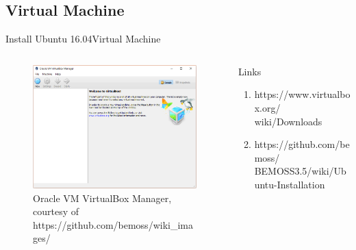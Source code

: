 \documentclass{beamer}
\begin{document}

\subsection{Virtual Machine}

\begin{frame}{Install Ubuntu 16.04}{Virtual Machine}
	\begin{columns}[T]
		\begin{column}{0.5\textwidth}
			\begin{figure}
				\centering
				\includegraphics[scale=0.26]{../figs/mainpage_virtualbox.png}
				\caption{Oracle VM VirtualBox Manager, 
				courtesy of https://github.com/bemoss/wiki\_images/}
			\end{figure}
		\end{column}
		\begin{column}{0.5\textwidth}
			\begin{block}{Links}
				\begin{enumerate}
					\item https://www.virtualbox.org/
					wiki/Downloads
					\item https://github.com/bemoss/
					BEMOSS3.5/wiki/Ubuntu-Installation
				\end{enumerate}
			\end{block}
		\end{column}
	\end{columns}
\end{frame}

\end{document}
